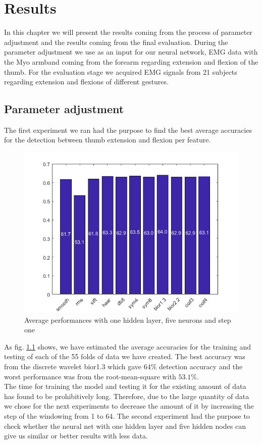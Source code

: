 \chapter{Results}
In this chapter we will present the results coming from the process of parameter adjustment and the results coming from the final evaluation. During the parameter adjustment we use as an input for our neural network, EMG data with the Myo armband coming from the forearm regarding extension and flexion of the thumb. For the evaluation stage we acquired EMG signals from 21 subjects regarding extension and flexions of different gestures. 
\section{Parameter adjustment}
The first experiment we ran had the purpose to find the best average accuracies for the detection between thumb extension and flexion per feature.
\begin{figure}[h!]
\includegraphics[width=15cm,left,keepaspectratio]{figures/HL1HN5step1}
\caption{Average performances with one hidden layer, five neurons and step one}
\label{fig:HL1HN5step1}
\end{figure}
As fig. \ref{fig:HL1HN5step1} shows, we have estimated the average accuracies for the training and testing of each of the 55 folds of data we have created. The best accuracy was from the discrete wavelet bior1.3 which gave $64 \%$ detection accuracy and the worst performance was from the root-mean-square with $53.1 \%$.\\
The time for training the model and testing it for the existing amount of data has found to be prohibitively long. Therefore, due to the large quantity of data we chose for the next experiments to decrease the amount of it by increasing the step of the windowing from 1 to 64. The second experiment had the purpose to check whether the neural net with one hidden layer and five hidden nodes can give us similar or better results with less data.
